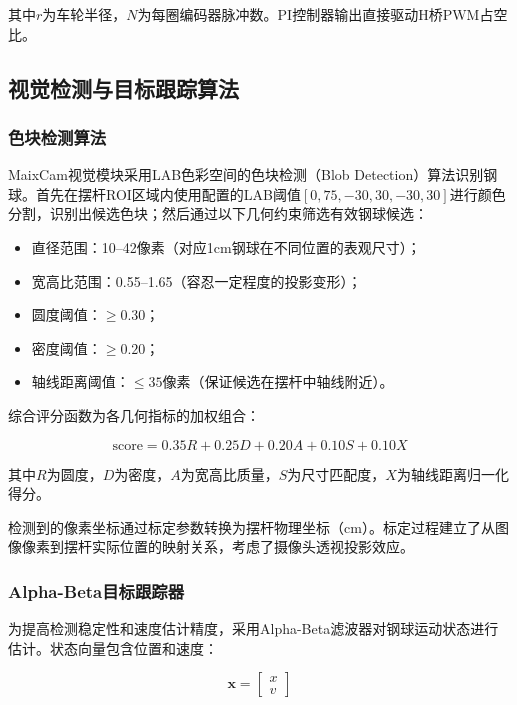 \documentclass[12pt,a4paper]{ctexart}
\begin{document}
其中$r$为车轮半径，$N$为每圈编码器脉冲数。PI控制器输出直接驱动H桥PWM占空比。

\subsection{\textbf{视觉检测与目标跟踪算法}}

\subsubsection{\textbf{色块检测算法}}

MaixCam视觉模块采用LAB色彩空间的色块检测（Blob Detection）算法识别钢球。首先在摆杆ROI区域内使用配置的LAB阈值$[0, 75, -30, 30, -30, 30]$进行颜色分割，识别出候选色块；然后通过以下几何约束筛选有效钢球候选：

\begin{itemize}
    \item 直径范围：10--42像素（对应1cm钢球在不同位置的表观尺寸）；
    \item 宽高比范围：0.55--1.65（容忍一定程度的投影变形）；
    \item 圆度阈值：$\geq 0.30$；
    \item 密度阈值：$\geq 0.20$；
    \item 轴线距离阈值：$\leq 35$像素（保证候选在摆杆中轴线附近）。
\end{itemize}

综合评分函数为各几何指标的加权组合：

\begin{equation}
\text{score} = 0.35R + 0.25D + 0.20A + 0.10S + 0.10X
\end{equation}

其中$R$为圆度，$D$为密度，$A$为宽高比质量，$S$为尺寸匹配度，$X$为轴线距离归一化得分。

检测到的像素坐标通过标定参数转换为摆杆物理坐标（cm）。标定过程建立了从图像像素到摆杆实际位置的映射关系，考虑了摄像头透视投影效应。

\subsubsection{Alpha-Beta目标跟踪器}

为提高检测稳定性和速度估计精度，采用Alpha-Beta滤波器对钢球运动状态进行估计。状态向量包含位置和速度：

\begin{equation}
\mathbf{x} = \begin{bmatrix} x \\ v \end{bmatrix}
\end{equation}
\end{document}
